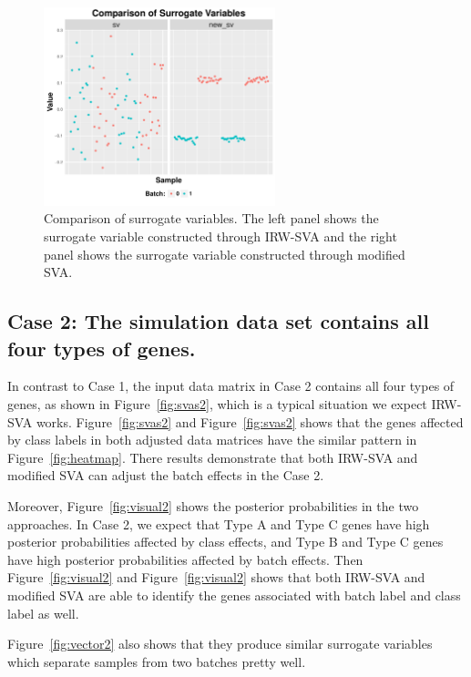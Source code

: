 \documentclass[11pt]{article}
\begin{document}
\begin{figure}
    \centering
    \includegraphics[width = 0.6\textwidth]{figures/vector1.pdf}
    \caption{Comparison of surrogate variables. The left panel shows the surrogate variable constructed through IRW-SVA and the right panel shows the surrogate variable constructed through modified SVA.}
    \label{fig:vector1}
\end{figure}

\newpage

\subsection{Case 2: The simulation data set contains all four types of genes.}

In contrast to Case 1, the input data matrix in Case 2 contains all four types of genes, as shown in Figure~\ref{fig:svas2}, which is a typical situation we expect IRW-SVA works. Figure~\ref{fig:svas2} and Figure~\ref{fig:svas2} shows that the genes affected by class labels in both adjusted data matrices have the similar pattern in Figure~\ref{fig:heatmap}. There results demonstrate that both IRW-SVA and modified SVA can adjust the batch effects in the Case 2.  

Moreover, Figure~\ref{fig:visual2} shows the posterior probabilities in the two approaches. In Case 2, we expect that Type A and Type C genes have high posterior probabilities affected by class effects, and Type B and Type C genes  have high posterior probabilities affected by batch effects. Then Figure~\ref{fig:visual2} and Figure~\ref{fig:visual2} shows that both IRW-SVA and modified SVA are able to identify the genes associated with batch label and class label as well. 

Figure~\ref{fig:vector2} also shows that they produce similar surrogate variables which separate samples from two batches pretty well.
\end{document}
